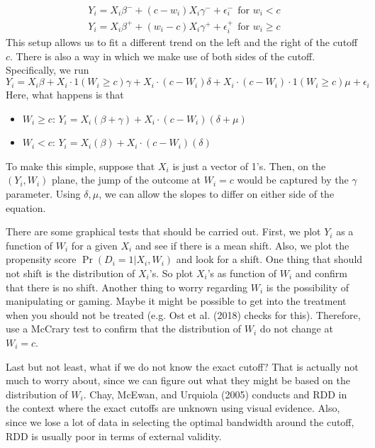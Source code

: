\begin{gather*}
Y_i = X_i\beta^- +(c-w_i)X_i\gamma^-+\epsilon_i^-\ \ \text{for }w_i<c\\
Y_i = X_i\beta^+ +(w_i-c)X_i\gamma^++\epsilon_i^+\ \ \text{for }w_i\geq c
\end{gather*}
This setup allows us to fit a different trend on the left and the right of the cutoff $c$. There is also a way in which we make use of both sides of the cutoff. Specifically, we run
\[
Y_i = X_i\beta+ X_i \cdot 1(W_i\geq c)\gamma+X_i\cdot(c-W_i)\delta+X_i\cdot (c-W_i)\cdot 1(W_i\geq c) \mu +\epsilon_i
\]
Here, what happens is that
\begin{itemize}
\item $W_i\geq c$: $Y_i=X_i(\beta+\gamma)+X_i\cdot(c-W_i)(\delta+\mu)$
\item $W_i< c$: $Y_i=X_i(\beta)+X_i\cdot(c-W_i)(\delta)$
\end{itemize}
To make this simple, suppose that $X_i$ is just a vector of 1's. Then, on the $(Y_i, W_i)$ plane,  the jump of the outcome at $W_i=c$ would be captured by the $\gamma$ parameter. Using $\delta, \mu$, we can allow the slopes to differ on either side of the equation. \par
There are some graphical tests that should be carried out. First, we plot $Y_i$ as a function of $W_i$ for a given $X_i$ and see if there is a mean shift. Also, we plot the propensity score $\Pr(D_i=1|X_i, W_i)$ and look for a shift. One thing that should not shift is the distribution of $X_i$'s. So plot $X_i$'s as function of $W_i$ and confirm that there is no shift. Another thing to worry regarding $W_i$ is the possibility of manipulating or gaming. Maybe it might be possible to get into the treatment when you should not be treated (e.g. Ost et al. (2018) checks for this). Therefore, use a McCrary test to confirm that the distribution of $W_i$ do not change at $W_i=c$. \par
Last but not least, what if we do not know the exact cutoff? That is actually not much to worry about, since we can figure out what they might be based on the distribution of $W_i$. Chay, McEwan, and Urquiola (2005) conducts and RDD in the context where the exact cutoffs are unknown using visual evidence. Also, since we lose a lot of data in selecting the optimal bandwidth around the cutoff, RDD is usually poor in terms of external validity.


